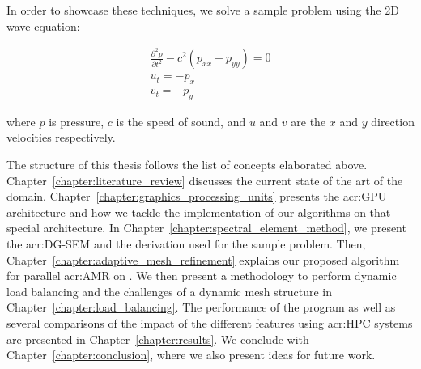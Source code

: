 In order to showcase these techniques, we solve a sample problem using the 2D wave equation:

\begin{gather}
    \frac{\partial^2p}{\partial t^2} - c^2(p_{xx} + p_{yy}) = 0 \\
    u_t = - p_x \\
    v_t = -p_y
\end{gather}

\noindent
where \(p\) is pressure, \(c\) is the speed of sound, and \(u\) and \(v\) are the \(x\) and \(y\)
direction velocities respectively. 

The structure of this thesis follows the list of concepts elaborated above.
Chapter~\ref{chapter:literature_review} discusses the current state of the art of the domain.
Chapter~\ref{chapter:graphics_processing_units} presents the \acrshort{acr:GPU} architecture and how
we tackle the implementation of our algorithms on that special architecture. In
Chapter~\ref{chapter:spectral_element_method}, we present the \acrshort{acr:DG-SEM} and the
derivation used for the sample problem. Then, Chapter~\ref{chapter:adaptive_mesh_refinement}
explains our proposed algorithm for parallel \acrshort{acr:AMR} on . We then
present a methodology to perform dynamic load balancing and the challenges of a dynamic mesh
structure in Chapter~\ref{chapter:load_balancing}. The performance of the program as well as several
comparisons of the impact of the different features using \acrshort{acr:HPC} systems are presented
in Chapter~\ref{chapter:results}. We conclude with Chapter~\ref{chapter:conclusion}, where we also
present ideas for future work.
